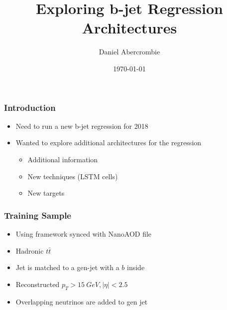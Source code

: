 \documentclass{beamer}
\author[D. Abercrombie]{
  Daniel Abercrombie
}
\title{\bf \sffamily Exploring b-jet Regression Architectures}
\date{\today}
\begin{document}
\begin{frame}
  \titlepage
\end{frame}

\begin{frame}
  \frametitle{Introduction}

  \begin{itemize}
  \item Need to run a new b-jet regression for 2018
  \item Wanted to explore additional architectures for the regression
    \begin{itemize}
    \item Additional information
    \item New techniques (LSTM cells)
    \item New targets
    \end{itemize}
  \end{itemize}

\end{frame}

\begin{frame}
  \frametitle{Training Sample}

  \begin{itemize}
  \item Using framework synced with NanoAOD file
  \item Hadronic $t\bar{t}$
  \item Jet is matched to a gen-jet with a $b$ inside
  \item Reconstructed $p_T > \SI{15}{GeV}, |\eta| < 2.5$
  \item Overlapping neutrinos are added to gen jet
  \end{itemize}

\end{frame}
\end{document}
